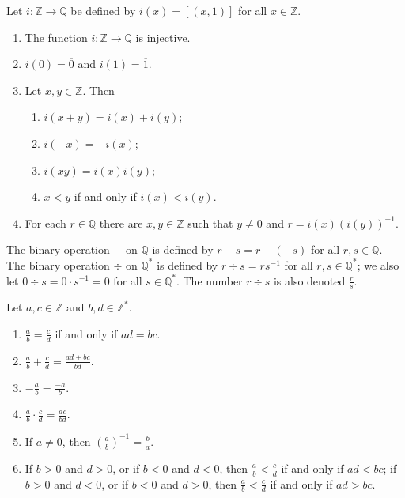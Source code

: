 \begin{theorem} %
	\label{rat:t:int}
	Let $i: \mathbb{Z} \to \mathbb{Q}$ be defined by $i(x) = [(x, 1)]$ for all $x \in \mathbb{Z}$.
	\begin{enumerate}
		\item The function $i: \mathbb{Z} \to \mathbb{Q}$ is injective. \label{rat:t:int:injective}
		\item $i(0) = \overline{0}$ and $i(1) = \overline{1}$. \label{rat:t:int:zero_one}
		\item Let $x, y \in \mathbb{Z}$. Then
		      \begin{enumerate}
			      \item $i(x + y) = i(x) + i(y)$;
			      \item $i(-x) = -i(x)$;
			      \item $i(x y) = i(x) i(y)$;
			      \item $x < y$ if and only if $i(x) < i(y)$.
		      \end{enumerate} \label{rat:t:int:props}
		\item For each $r \in \mathbb{Q}$ there are $x, y \in \mathbb{Z}$ such that $y \neq 0$ and $r = i(x)(i(y))^{-1}$.
	\end{enumerate}
\end{theorem}

\begin{definition} %
	The binary operation $-$ on $\mathbb{Q}$ is defined by $r - s = r + (-s)$ for all $r, s \in \mathbb{Q}$. The binary operation $\div$ on $\mathbb{Q}^{*}$ is defined by $r \div s = r s^{-1}$ for all $r, s \in \mathbb{Q}^{*}$; we also let $0 \div s = 0 \cdot s^{-1} = 0$ for all $s \in \mathbb{Q}^{*}$. The number $r \div s$ is also denoted $\frac{r}{s}$.
\end{definition}

\begin{lemma} %
	Let $a, c \in \mathbb{Z}$ and $b, d \in \mathbb{Z}^{*}$.
	\begin{enumerate}
		\item $\frac{a}{b} = \frac{c}{d}$ if and only if $a d = b c$.
		\item $\frac{a}{b} + \frac{c}{d} = \frac{a d + b c}{b d}$.
		\item $-\frac{a}{b} = \frac{-a}{b}$.
		\item $\frac{a}{b} \cdot \frac{c}{d} = \frac{a c}{b d}$.
		\item If $a \neq 0$, then $\left( \frac{a}{b} \right)^{-1} = \frac{b}{a}$.
		\item If $b > 0$ and $d > 0$, or if $b < 0$ and $d < 0$, then $\frac{a}{b} < \frac{c}{d}$ if and only if $a d < b c$; if $b > 0$ and $d < 0$, or if $b < 0$ and $d > 0$, then $\frac{a}{b} < \frac{c}{d}$ if and only if $a d > b c$.
	\end{enumerate}
\end{lemma}



